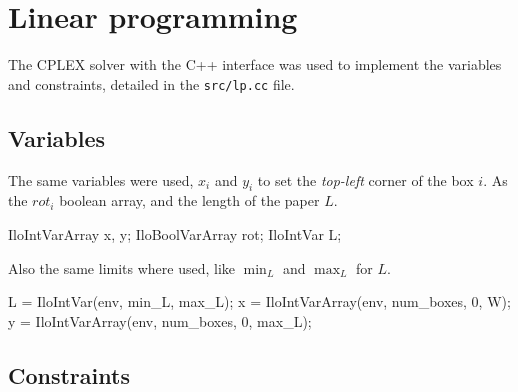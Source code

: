 \documentclass[a4paper]{article}
\begin{document}
\section{Linear programming}

The CPLEX solver with the C++ interface was used to implement the variables and 
constraints, detailed in the \texttt{src/lp.cc} file.

\subsection{Variables}

The same variables were used, $x_i$ and $y_i$ to set the \textsl{top-left} 
corner of the box $i$. As the $rot_i$ boolean array, and the length of the paper 
$L$.
%
\begin{cppcode}
IloIntVarArray x, y;
IloBoolVarArray rot;
IloIntVar L;
\end{cppcode}
%
Also the same limits where used, like $\min_L$ and $\max_L$ for $L$.
%
\begin{cppcode}
L = IloIntVar(env, min_L, max_L);
x = IloIntVarArray(env, num_boxes, 0, W);
y = IloIntVarArray(env, num_boxes, 0, max_L);
\end{cppcode}
%
\subsection{Constraints}
\end{document}
